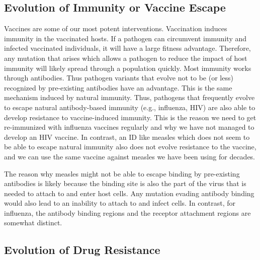 \documentclass[]{book}
\theoremstyle{definition}
\theoremstyle{definition}
\theoremstyle{definition}
\theoremstyle{remark}
\begin{document}
\subsection{Evolution of Immunity or Vaccine
Escape}\label{evolution-of-immunity-or-vaccine-escape}

Vaccines are some of our most potent interventions. Vaccination induces
immunity in the vaccinated hosts. If a pathogen can circumvent immunity
and infected vaccinated individuals, it will have a large fitness
advantage. Therefore, any mutation that arises which allows a pathogen
to reduce the impact of host immunity will likely spread through a
population quickly. Most immunity works through antibodies. Thus
pathogen variants that evolve not to be (or less) recognized by
pre-existing antibodies have an advantage. This is the same mechanism
induced by natural immunity. Thus, pathogens that frequently evolve to
escape natural antibody-based immunity (e.g., influenza, HIV) are also
able to develop resistance to vaccine-induced immunity. This is the
reason we need to get re-immunized with influenza vaccines regularly and
why we have not managed to develop an HIV vaccine. In contrast, an ID
like measles which does not seem to be able to escape natural immunity
also does not evolve resistance to the vaccine, and we can use the same
vaccine against measles we have been using for decades.

The reason why measles might not be able to escape binding by
pre-existing antibodies is likely because the binding site is also the
part of the virus that is needed to attach to and enter host cells. Any
mutation evading antibody binding would also lead to an inability to
attach to and infect cells. In contrast, for influenza, the antibody
binding regions and the receptor attachment regions are somewhat
distinct.

\subsection{Evolution of Drug
Resistance}\label{evolution-of-drug-resistance}
\end{document}
